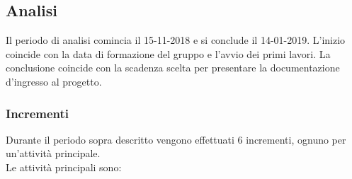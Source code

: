 \subsection{Analisi}

Il periodo di analisi comincia il 15-11-2018 e si conclude il 14-01-2019. L'inizio coincide con la data di formazione del gruppo e l'avvio dei primi lavori. La conclusione coincide con la scadenza scelta per presentare la documentazione d'ingresso al progetto.

\subsubsection{Incrementi}
Durante il periodo sopra descritto vengono effettuati 6 incrementi, ognuno per un'attività principale.\\
Le attività principali sono:
